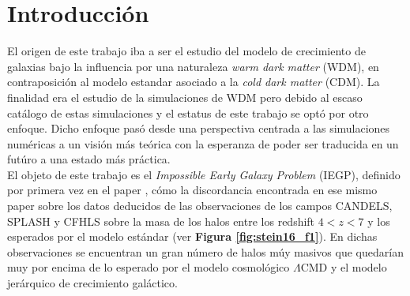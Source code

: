 
\chapter{Introducción} %

\label{introduction} %


\newcommand{\keyword}[1]{\textbf{#1}}
\newcommand{\tabhead}[1]{\textbf{#1}}
\newcommand{\code}[1]{\texttt{#1}}
\newcommand{\file}[1]{\texttt{\bfseries#1}}
\newcommand{\option}[1]{\texttt{\itshape#1}}



El origen de este trabajo iba a ser el estudio del modelo de crecimiento de galaxias bajo la influencia por una naturaleza \textit{warm dark matter} (WDM), en contraposición al modelo estandar asociado a la \textit{cold dark matter} (CDM). La finalidad era el estudio de la simulaciones de WDM pero debido al escaso cat\'alogo de estas simulaciones y el estatus de este trabajo se opt\'o por otro enfoque. Dicho enfoque pas\'o desde una perspectiva centrada a las simulaciones num\'ericas a un visi\'on m\'as te\'orica con la esperanza de poder ser traducida en un fut\'uro a una estado m\'as pr\'actica.\\

El objeto de este trabajo es el \textit{Impossible Early Galaxy Problem} (IEGP), definido por primera vez en el paper \cite{steinhardt2016impossibly}, c\'omo la discordancia encontrada en ese mismo paper sobre los datos deducidos de las observaciones de los campos CANDELS, SPLASH y CFHLS sobre la masa de los halos entre los redshift $4<z<7$ y los esperados por el modelo est\'andar (ver \textbf{Figura \ref{fig:stein16_f1}}). En dichas observaciones se encuentran un gran n\'umero de halos m\'uy masivos que quedar\'ian muy por encima de lo esperado por el modelo cosmol\'ogico $\Lambda$CMD y el modelo jer\'arquico de crecimiento gal\'actico.

